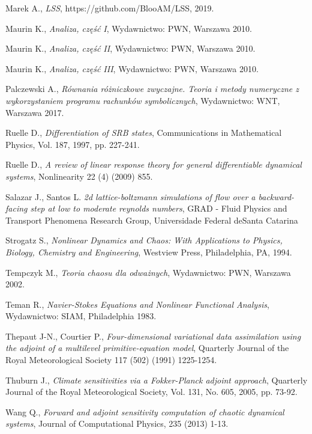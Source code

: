 \documentclass[12pt]{article}
\begin{document}
\begin{thebibliography}{99}
 Marek A.,
\emph{LSS},
https://github.com/BlooAM/LSS, 2019.

 Maurin K.,
\emph{Analiza, część I},
Wydawnictwo: PWN, Warszawa 2010.

 Maurin K.,
\emph{Analiza, część II},
Wydawnictwo: PWN, Warszawa 2010.

 Maurin K.,
\emph{Analiza, część III},
Wydawnictwo: PWN, Warszawa 2010.

 Palczewski A.,
\emph{Równania różniczkowe zwyczajne. Teoria i metody numeryczne z wykorzystaniem programu rachunków symbolicznych},
Wydawnictwo: WNT, Warszawa 2017.

 Ruelle D.,
\emph{Differentiation of SRB states},
Communications in Mathematical Physics, Vol. 187, 1997, pp. 227-241.

 Ruelle D.,
\emph{ A review of linear response theory for general differentiable dynamical systems},
Nonlinearity 22 (4) (2009) 855.

 Salazar J., Santos L.
\emph{2d lattice-boltzmann simulations of flow over a backward-facing step at low to moderate reynolds numbers},
GRAD - Fluid Physics and Transport Phenomena Research Group, Universidade Federal deSanta Catarina
	
 Strogatz S., 
\emph{Nonlinear Dynamics and Chaos: With Applications to Physics, Biology, Chemistry and Engineering},
Westview Press, Philadelphia, PA, 1994.  

 Tempczyk M., 
\emph{Teoria chaosu dla odważnych},
Wydawnictwo: PWN, Warszawa 2002.

 Teman R., 
\emph{Navier-Stokes Equations and Nonlinear Functional Analysis},
Wydawnictwo: SIAM, Philadelphia 1983.
	
 Thepaut J-N., Courtier P., 
\emph{Four-dimensional variational data assimilation using the adjoint of a multilevel primitive-equation model},
Quarterly Journal of the Royal Meteorological Society 117 (502) (1991) 1225-1254.

 Thuburn J.,
\emph{Climate sensitivities via a Fokker-Planck adjoint approach},
Quarterly Journal of the Royal Meteorological Society, Vol. 131, No. 605, 2005, pp. 73-92.

 Wang Q.,
\emph{Forward and adjoint sensitivity computation of chaotic dynamical systems},
Journal of Computational Physics, 235 (2013) 1-13.


\end{thebibliography}
\end{document}
